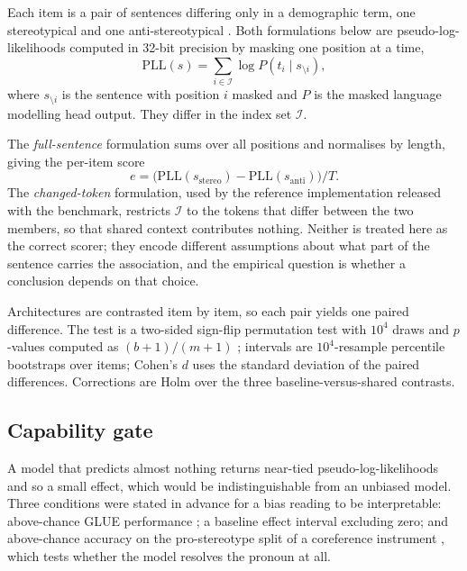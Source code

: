\documentclass[sigconf,natbib=true,anonymous=true]{acmart}
\begin{document}
Each item is a pair of sentences differing only in a demographic term, one
stereotypical and one anti-stereotypical \citep{nangia2020crows}. Both
formulations below are pseudo-log-likelihoods computed in 32-bit precision by
masking one position at a time,
%
\begin{equation}
\mathrm{PLL}(s) = \sum_{i \in \mathcal{I}} \log P\!\left(t_i \mid s_{\setminus i}\right),
\end{equation}
%
where $s_{\setminus i}$ is the sentence with position $i$ masked and $P$ is the
masked language modelling head output. They differ in the index set
$\mathcal{I}$.

The \emph{full-sentence} formulation sums over all positions and normalises by
length, giving the per-item score
%
\begin{equation}
e = \bigl(\mathrm{PLL}(s_{\text{stereo}}) - \mathrm{PLL}(s_{\text{anti}})\bigr) / T .
\end{equation}
%
The \emph{changed-token} formulation, used by the reference implementation
released with the benchmark, restricts $\mathcal{I}$ to the tokens that differ
between the two members, so that shared context contributes nothing. Neither is
treated here as the correct scorer; they encode different assumptions about what
part of the sentence carries the association, and the empirical question is
whether a conclusion depends on that choice.

Architectures are contrasted item by item, so each pair yields one paired
difference. The test is a two-sided sign-flip permutation test with $10^4$ draws
and $p$-values computed as $(b+1)/(m+1)$ \citep{phipson2010permutation};
intervals are $10^4$-resample percentile bootstraps over items; Cohen's $d$ uses
the standard deviation of the paired differences. Corrections are Holm over the
three baseline-versus-shared contrasts.

\subsection{Capability gate}
\label{sec:gate}

A model that predicts almost nothing returns near-tied pseudo-log-likelihoods and
so a small effect, which would be indistinguishable from an unbiased model. Three
conditions were stated in advance for a bias reading to be interpretable: above-chance
GLUE performance \citep{wang2018glue}; a baseline effect interval excluding zero;
and above-chance accuracy on the pro-stereotype split of a coreference instrument
\citep{zhao2018winobias}, which tests whether the model resolves the pronoun at
all.
\end{document}
